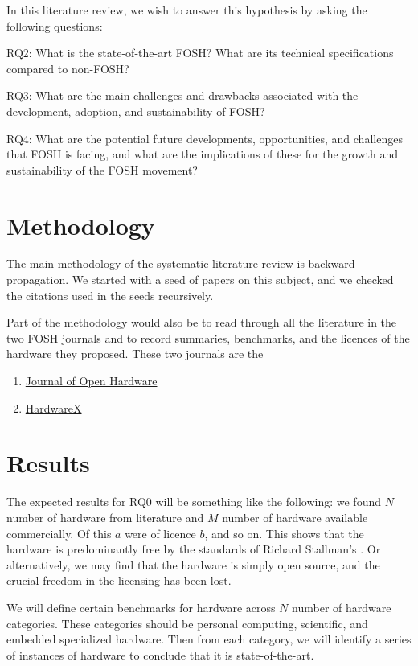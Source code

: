 \documentclass[acmtog]{acmart}
\begin{document}
In this literature review, we wish to answer this hypothesis by asking the following questions:

RQ2: What is the state-of-the-art FOSH? What are its technical specifications compared to non-FOSH? 

RQ3: What are the main challenges and drawbacks associated with the development, adoption, and sustainability of FOSH?

RQ4: What are the potential future developments, opportunities, and challenges that FOSH is facing, and what are the implications of these for the growth and sustainability of the FOSH movement?


\section{Methodology}

The main methodology of the systematic literature review is backward propagation. 
We started with a seed of papers on this subject, and we checked the citations used in the seeds recursively. 

Part of the methodology would also be to read through all the literature in the two FOSH journals and to record summaries, benchmarks, and the licences of the hardware they proposed.
These two journals are the 
\begin{enumerate}
    \item \href{https://openhardware.metajnl.com/}{Journal of Open Hardware}
    \item \href{https://www.sciencedirect.com/journal/hardwarex}{HardwareX}
\end{enumerate}


\section{Results}

The expected results for RQ0 will be something like the following:
we found $N$ number of hardware from literature and $M$ number of hardware available commercially. 
Of this $a$ were of licence $b$, and so on. 
This shows that the hardware is predominantly free by the standards of Richard Stallman's \cite{b0_stallman}.
Or alternatively, we may find that the hardware is simply open source, and the crucial freedom in the licensing has been lost. 

We will define certain benchmarks for hardware across $N$ number of hardware categories. 
These categories should be personal computing, scientific, and embedded specialized hardware. 
Then from each category, we will identify a series of instances of hardware to conclude that it is state-of-the-art.
\end{document}
